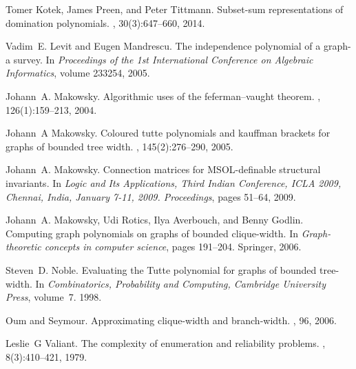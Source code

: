 \documentclass{llncs}
\begin{document}
\begin{thebibliography}{10}
Tomer Kotek, James Preen, and Peter Tittmann.
\newblock Subset-sum representations of domination polynomials.
, 30(3):647--660, 2014.

Vadim~E. Levit and Eugen Mandrescu.
\newblock The independence polynomial of a graph-a survey.
\newblock In {\em Proceedings of the 1st International Conference on Algebraic
  Informatics}, volume 233254, 2005.

Johann~A. Makowsky.
\newblock Algorithmic uses of the feferman--vaught theorem.
, 126(1):159--213, 2004.

Johann~A Makowsky.
\newblock Coloured tutte polynomials and kauffman brackets for graphs of
  bounded tree width.
, 145(2):276--290, 2005.

Johann~A. Makowsky.
\newblock Connection matrices for {MSOL}-definable structural invariants.
\newblock In {\em Logic and Its Applications, Third Indian Conference, {ICLA}
  2009, Chennai, India, January 7-11, 2009. Proceedings}, pages 51--64, 2009.

Johann~A. Makowsky, Udi Rotics, Ilya Averbouch, and Benny Godlin.
\newblock Computing graph polynomials on graphs of bounded clique-width.
\newblock In {\em Graph-theoretic concepts in computer science}, pages
  191--204. Springer, 2006.

Steven~D. Noble.
\newblock Evaluating the {T}utte polynomial for graphs of bounded tree-width.
\newblock In {\em Combinatorics, Probability and Computing, Cambridge
  University Press}, volume~7. 1998.

Oum and Seymour.
\newblock Approximating clique-width and branch-width.
, 96, 2006.

Leslie~G Valiant.
\newblock The complexity of enumeration and reliability problems.
, 8(3):410--421, 1979.

\end{thebibliography}
\end{document}
